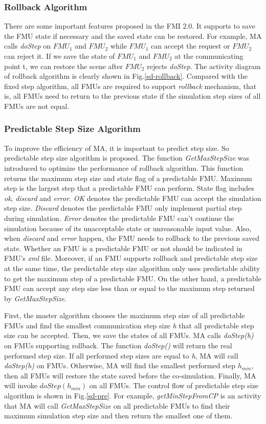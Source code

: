 \subsubsection{Rollback Algorithm}
There are some important features proposed in the FMI 2.0. It supports to save the FMU state if necessary and the saved state can be restored. For example, MA calls \emph{doStep} on $FMU_{1}$ and $FMU_{2}$ while $FMU_{1}$ can accept the request or $FMU_{2}$ can reject it. If we save the state of $FMU_{1}$ and $FMU_{2}$ at the communicating point \textrm{t}, we can restore the scene after $FMU_{2}$ rejects \emph{doStep}. The activity diagram of rollback algorithm is clearly shown in Fig.\ref{sd-rollback}. Compared with the fixed step algorithm, all FMUs are required to support \emph{rollback} mechanism, that is, all FMUs need to return to the previous state if the simulation step sizes of all FMUs are not equal.
\subsubsection{Predictable Step Size Algorithm}
To improve the efficiency of MA, it is important to predict step size. So predictable step size algorithm is proposed. The function \emph{GetMaxStepSize} was introduced to optimize the performance of rollback algorithm. This function returns the maximum step size and state flag of a predictable FMU. Maximum step is the largest step that a predictable FMU can perform. State flag includes \emph{ok}, \emph{discard} and \emph{error}. \emph{OK} denotes the predictable FMU can accept the simulation step size. \emph{Discard} denotes the predictable FMU only implement partial step during simulation. \emph{Error} denotes the predictable FMU can't continue the simulation because of its unacceptable state or unreasonable input value. Also, when \emph{discard} and \emph{error} happen, the FMU needs to rollback to the previous saved state. Whether an FMU is a predictable FMU or not should be indicated in FMU's \emph{xml} file. Moreover, if an FMU supports rollback and predictable step size at the same time, the predictable step size algorithm only uses predictable ability to get the maximum step of a predictable FMU. On the other hand, a predictable FMU can accept any step size less than or equal to the maximum step returned by \emph{GetMaxStepSize}.

First, the master algorithm chooses the maximum step size of all predictable FMUs and find the smallest communication step size \emph{h} that all predictable step size can be accepted. Then, we save the states of all FMUs. MA calls \emph{doStep(h)} on FMUs supporting rollback. The function \emph{doStep()} will return the real performed step size. If all performed step sizes are equal to \emph{h}, MA will call \emph{doStep(h)} on FMUs. Otherwise, MA will find the smallest performed step $h_{min}$, then all FMUs will restore the state saved before the co-simulation. Finally, MA will invoke $doStep(h_{min})$ on all FMUs. The control flow of predictable step size algorithm is shown in Fig.\ref{sd-pre}. For example, \emph{getMinStepFromCP} is an activity that MA will call \emph{GetMaxStepSize} on all predictable FMUs to find their maximum simulation step size and then return the smallest one of them. 


